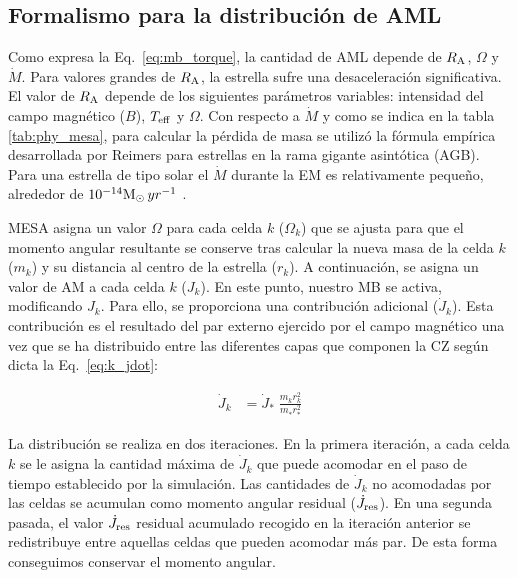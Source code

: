 \subsection{Formalismo para la distribución de AML} \label{mod_aml}
Como expresa la Eq.~\ref{eq:mb_torque}, la cantidad de AML depende de $R_{\mathrm{A}}$, $\Omega$ y $\Dot{M}$. Para valores grandes de $R_{\mathrm{A}}$, la estrella sufre una desaceleración significativa. El valor de $R_{\mathrm{A}}$ depende de los siguientes parámetros variables: intensidad del campo magnético ($B$), $T_{\mathrm{eff}}$ y $\Omega$. Con respecto a $\Dot{M}$ y como se indica en la tabla \ref{tab:phy_mesa}, para calcular la pérdida de masa se utilizó la fórmula empírica desarrollada por Reimers \cite{Reimers1975} para estrellas en la rama gigante asintótica (AGB). Para una estrella de tipo solar el $\Dot{M}$ durante la EM es relativamente pequeño, alrededor de $10^{-14}\mathrm{M}_\odot \, yr^{-1}$ \cite{Noerdlinger2008}. \par

MESA asigna un valor $\Omega$ para cada celda $k$ ($\Omega_k$) que se ajusta para que el momento angular resultante se conserve tras calcular la nueva masa de la celda $k$ ($m_k$) y su distancia al centro de la estrella ($r_k$). A continuación, se asigna un valor de AM a cada celda $k$ ($J_k$). En este punto, nuestro MB se activa, modificando $J_k$. Para ello, se proporciona una contribución adicional ($\Dot{J}_{k}$). Esta contribución es el resultado del par externo ejercido por el campo magnético una vez que se ha distribuido entre las diferentes capas que componen la CZ según dicta la Eq.~\ref{eq:k_jdot}:\par

\begin{ceqn}
	\begin{align}
		\Dot{J}_{k} &= \Dot{J}_*\;\frac{m^{}_{k} r^2_{k}}{m^{}_* r_*^2} \label{eq:k_jdot}
	\end{align}
\end{ceqn}

La distribución se realiza en dos iteraciones. En la primera iteración, a cada celda $k$ se le asigna la cantidad máxima de $\Dot{J}_{k}$ que puede acomodar en el paso de tiempo establecido por la simulación. Las cantidades de $\Dot{J}_{k}$ no acomodadas por las celdas se acumulan como momento angular residual ($\Dot{J}_{\mathrm{res}}$). En una segunda pasada, el valor $\Dot{J}_{\mathrm{res}}$ residual acumulado recogido en la iteración anterior se redistribuye entre aquellas celdas que pueden acomodar más par. De esta forma conseguimos conservar el momento angular.\par


